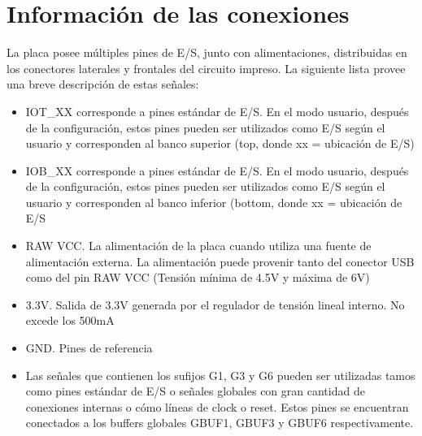 \newpage
\section{Información de las conexiones}
La placa posee múltiples pines de E/S, junto con alimentaciones, distribuidas en los conectores laterales y frontales del circuito impreso. La siguiente lista provee una breve descripción de estas señales:
\begin{itemize}
	\item IOT\_XX corresponde a pines estándar de E/S. En el modo usuario, después de la configuración, estos pines pueden ser utilizados como E/S según el usuario y corresponden al banco superior (top, donde xx = ubicación de E/S)
	\item IOB\_XX corresponde a pines estándar de E/S. En el modo usuario, después de la configuración, estos pines pueden ser utilizados como E/S según el usuario y corresponden al banco inferior (bottom, donde xx = ubicación de E/S
	\item RAW VCC. La alimentación de la placa cuando utiliza una fuente de alimentación externa. La alimentación puede provenir tanto del conector USB como del pin RAW VCC (Tensión mínima de 4.5V y máxima de 6V)
	\item 3.3V. Salida de 3.3V generada por el regulador de tensión lineal interno. No excede los 500mA
	\item GND. Pines de referencia
	\item Las señales que contienen los sufijos G1, G3 y G6 pueden ser utilizadas tamos como pines estándar de E/S o señales globales con gran cantidad de conexiones internas o cómo líneas de clock o reset. Estos pines se encuentran conectados a los buffers globales GBUF1, GBUF3 y GBUF6 respectivamente.
\end{itemize}

